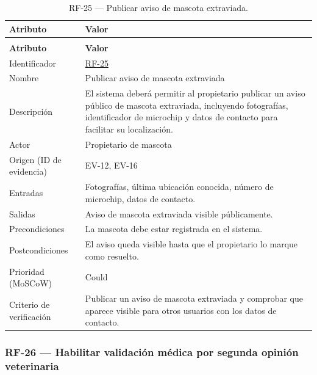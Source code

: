 \documentclass[journal,onecolumn]{IEEEtran}
\makeatletter
\newenvironment{atributos}[2]{%
	\small
	\begin{longtable}{@{}>{\raggedright\arraybackslash}p{4.2cm} >{\raggedright\arraybackslash}p{11.2cm}@{}}
		\caption{#2}\label{tab:#1}\\
		\toprule
		\textbf{Atributo} & \textbf{Valor} \\
		\midrule
		\endfirsthead
		\multicolumn{2}{@{}l}{\small\itshape (continuación)}\\
		\toprule
		\textbf{Atributo} & \textbf{Valor} \\
		\midrule
		\endhead
		\bottomrule
		\endlastfoot
	}{%
	\end{longtable}
	\normalsize
}
\makeatother
\begin{document}
	\begin{atributos}{RF-25}{RF-25 --- Publicar aviso de mascota extraviada.}
		Identificador & \hyperref[tab:RF-25]{RF-25} \\
		Nombre & Publicar aviso de mascota extraviada \\
		Descripción & El sistema deberá permitir al propietario publicar un aviso público de mascota extraviada, incluyendo fotografías, identificador de microchip y datos de contacto para facilitar su localización. \\
		Actor & Propietario de mascota \\
		Origen (ID de evidencia) & EV-12, EV-16 \\
		Entradas & Fotografías, última ubicación conocida, número de microchip, datos de contacto. \\
		Salidas & Aviso de mascota extraviada visible públicamente. \\
		Precondiciones & La mascota debe estar registrada en el sistema. \\
		Postcondiciones & El aviso queda visible hasta que el propietario lo marque como resuelto. \\
		Prioridad (MoSCoW) & Could \\
		Criterio de verificación & Publicar un aviso de mascota extraviada y comprobar que aparece visible para otros usuarios con los datos de contacto. \\
	\end{atributos}
	
	\subsubsection{RF-26 --- Habilitar validación médica por segunda opinión veterinaria}
	
\end{document}
